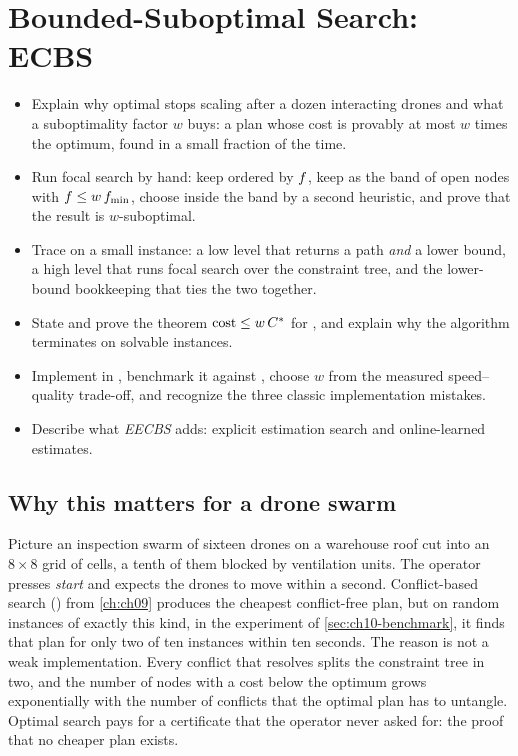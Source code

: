 \chapter{Bounded-Suboptimal Search: ECBS}
\label{ch:ch10}

\begin{objectives}
\begin{itemize}
  \item Explain why optimal \cbs stops scaling after a dozen interacting drones and what a suboptimality factor $w$ buys: a plan whose cost is provably at most $w$ times the optimum, found in a small fraction of the time.
  \item Run focal search by hand: keep \Open ordered by $f$, keep \Focal as the band of open nodes with $f \le w\,f_{\min}$, choose inside the band by a second heuristic, and prove that the result is $w$-suboptimal.
  \item Trace \ecbs on a small instance: a low level that returns a path \emph{and} a lower bound, a high level that runs focal search over the constraint tree, and the lower-bound bookkeeping that ties the two together.
  \item State and prove the theorem $\operatorname{cost} \le w\,C^*$ for \ecbs, and explain why the algorithm terminates on solvable instances.
  \item Implement \ecbs in \python, benchmark it against \cbs, choose $w$ from the measured speed--quality trade-off, and recognize the three classic implementation mistakes.
  \item Describe what \emph{EECBS} adds: explicit estimation search and online-learned estimates.
\end{itemize}
\end{objectives}

\section{Why this matters for a drone swarm}
\label{sec:ch10-motivation}

Picture an inspection swarm of sixteen drones on a warehouse roof cut into an
$8 \times 8$ grid of cells, a tenth of them blocked by ventilation units. The
operator presses \emph{start} and expects the drones to move within a second.
Conflict-based search (\cbs) from \cref{ch:ch09} produces the cheapest
conflict-free plan, but on random instances of exactly this kind, in the
experiment of \cref{sec:ch10-benchmark}, it finds that plan for only two of ten
instances within ten seconds. The reason is not a weak implementation. Every
conflict that \cbs resolves splits the constraint tree in two, and the number
of nodes with a cost below the optimum grows exponentially with the number of
conflicts that the optimal plan has to untangle. Optimal search pays for a
certificate that the operator never asked for: the proof that no cheaper plan
exists.

